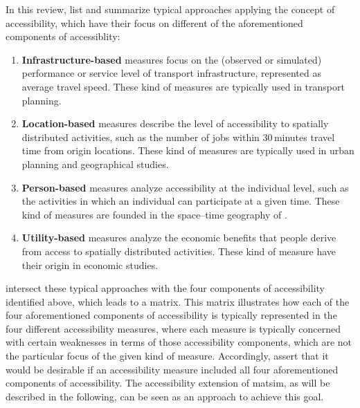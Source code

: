 In this review, \citet{Geurs2004AccessibilityReview} list and summarize typical approaches applying the concept 
of accessibility, which have their focus on different of the aforementioned components of accessiblity:

\begin{enumerate}
	\item \textbf{Infrastructure-based} measures focus on the (observed or simulated) performance or service level 
	of transport infrastructure, \eg represented as average travel speed. These kind of measures are typically used 
	in transport planning.
	
	\item \textbf{Location-based} measures describe the level of accessibility to spatially distributed activities, such as 
	the number of jobs within 30\,minutes travel time from origin locations. These kind of measures are typically used 
	in urban planning and geographical studies.
	
	
	\item \textbf{Person-based} measures analyze accessibility at the individual level, such as the activities in which an 
	individual can participate at a given time. These kind of measures are founded in the space–time geography 
	of \citet{Haegerstrand1970}.
	
	\item \textbf{Utility-based} measures analyze the economic benefits that people derive from access to spatially 
	distributed activities. These kind of measure have their origin in economic studies.
\end{enumerate}

\citet{Geurs2004AccessibilityReview} intersect these typical approaches with the four components of accessibility identified 
above, which leads to a matrix. This matrix illustrates how each of the four aforementioned components of accessibility is 
typically represented in the four different accessibility measures, where each measure is typically concerned with certain weaknesses 
in terms of those accessibility components, which are not the particular focus of the given kind of measure. Accordingly, \citet{Geurs2004AccessibilityReview} assert that it would be desirable if an accessibility measure included 
all four aforementioned components of accessibility. The accessibility extension of \gls{matsim}, as will be described in 
the following, can be seen as an approach to achieve this goal.

